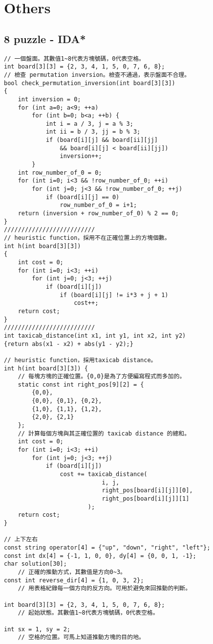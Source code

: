 \documentclass[11pt,twocolumn,a4paper]{article}
\begin{document}
\newpage
\section{Others}
\subsection{8 puzzle - IDA*}
\begin{lstlisting}[label=8 puzzle - IDA*]
// 一個盤面。其數值1~8代表方塊號碼，0代表空格。
int board[3][3] = {2, 3, 4, 1, 5, 0, 7, 6, 8};
// 檢查 permutation inversion。檢查不通過，表示盤面不合理。
bool check_permutation_inversion(int board[3][3])
{
	int inversion = 0;
	for (int a=0; a<9; ++a)
		for (int b=0; b<a; ++b) {
			int i = a / 3, j = a % 3;
			int ii = b / 3, jj = b % 3;
			if (board[i][j] && board[ii][jj]
				&& board[i][j] < board[ii][jj])
				inversion++;
		}
	int row_number_of_0 = 0;
	for (int i=0; i<3 && !row_number_of_0; ++i)
		for (int j=0; j<3 && !row_number_of_0; ++j)
			if (board[i][j] == 0)
				row_number_of_0 = i+1;
	return (inversion + row_number_of_0) % 2 == 0;
}
//////////////////////////
// heuristic function，採用不在正確位置上的方塊個數。
int h(int board[3][3])
{
	int cost = 0;
	for (int i=0; i<3; ++i)
		for (int j=0; j<3; ++j)
			if (board[i][j])
				if (board[i][j] != i*3 + j + 1)
					cost++;
	return cost;
}
//////////////////////////
int taxicab_distance(int x1, int y1, int x2, int y2)
{return abs(x1 - x2) + abs(y1 - y2);}
 
// heuristic function，採用taxicab distance。
int h(int board[3][3]) {
	// 每塊方塊的正確位置。{0,0}是為了方便編寫程式而多加的。
	static const int right_pos[9][2] = {
		{0,0},
		{0,0}, {0,1}, {0,2},
		{1,0}, {1,1}, {1,2},
		{2,0}, {2,1}
	};
	// 計算每個方塊與其正確位置的 taxicab distance 的總和。
	int cost = 0;
	for (int i=0; i<3; ++i)
		for (int j=0; j<3; ++j)
			if (board[i][j])
				cost += taxicab_distance(
							i, j,
							right_pos[board[i][j]][0],
							right_pos[board[i][j]][1]
						);
	return cost;
}

// 上下左右
const string operator[4] = {"up", "down", "right", "left"};
const int dx[4] = {-1, 1, 0, 0}, dy[4] = {0, 0, 1, -1};
char solution[30];
	// 正確的推動方式，其數值是方向0~3。
const int reverse_dir[4] = {1, 0, 3, 2};
	// 用表格紀錄每一個方向的反方向。可用於避免來回推動的判斷。

int board[3][3] = {2, 3, 4, 1, 5, 0, 7, 6, 8};
	// 起始狀態。其數值1~8代表方塊號碼，0代表空格。

int sx = 1, sy = 2;
	// 空格的位置。可馬上知道推動方塊的目的地。


\end{lstlisting}
\end{document}
